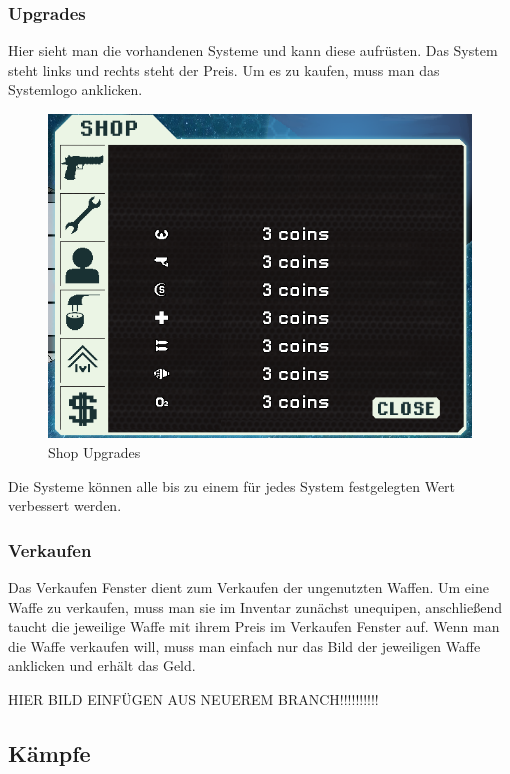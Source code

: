 \documentclass[fontsize=12pt,paper=a4,twoside]{scrartcl}
\begin{document}
\subsubsection{Upgrades}

Hier sieht man die vorhandenen Systeme und kann diese aufrüsten. Das System steht links und rechts steht der Preis. Um es zu kaufen, muss man das Systemlogo anklicken. 

\begin{figure}[H]
\centering
\includegraphics[width=1\linewidth]{DasSpiel/Shop/upgrades.png}
\caption{Shop Upgrades}
\end{figure}

Die Systeme können alle bis zu einem für jedes System festgelegten Wert verbessert werden. 

\subsubsection{Verkaufen}

Das Verkaufen Fenster dient zum Verkaufen der ungenutzten Waffen. Um eine Waffe zu verkaufen, muss man sie im Inventar zunächst unequipen, anschließend taucht die jeweilige Waffe mit ihrem Preis im Verkaufen Fenster auf. Wenn man die Waffe verkaufen will, muss man einfach nur das Bild der jeweiligen Waffe anklicken und erhält das Geld. 

HIER BILD EINFÜGEN AUS NEUEREM BRANCH!!!!!!!!!!

\subsection{Kämpfe}
\end{document}
